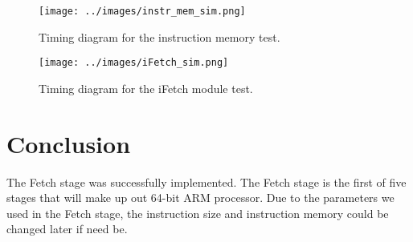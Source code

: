 \documentclass{article}
\newcommand{\Verilog}[3]{
  \lstset{language=Verilog}
  \lstset{backgroundcolor=\color{listinggray},rulecolor=\color{blue}}
  \lstset{linewidth=\textwidth}
  \lstset{commentstyle=\textit, stringstyle=\upshape,showspaces=false}
  \lstset{frame=tb}
  
}
\begin{document}
%
%
%
%
\begin{figure}
\begin{center}
\caption{Timing diagram for the instruction memory test.}\label{fig:instrsim}
\texttt{[image: ../images/instr\_mem\_sim.png]}
\end{center}
\end{figure}

\begin{figure}
\begin{center}
	\caption{Timing diagram for the iFetch module test.}\label{fig:ifetchsim}
	\texttt{[image: ../images/iFetch\_sim.png]}
\end{center}
\end{figure}

\section{Conclusion}
The Fetch stage was successfully implemented. The Fetch stage is the first of five stages that will make up out 64-bit ARM processor. Due to the parameters we used in the Fetch stage, the instruction size and instruction memory could be changed later if need be. 
\end{document}
